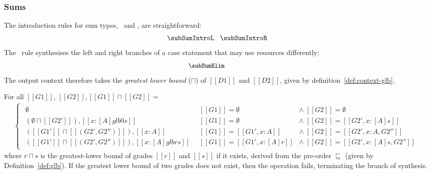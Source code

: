 \subsubsection{Sums}
The introduction rules for sum types, \subSumIntroLname\ and \subSumIntroRname, are straightforward:
\begin{align*}
  \subSumIntroL
\;\;\;
  \subSumIntroR
\end{align*}
The \subSumElimName\ rule synthesises the left and
right branches of a case statement that may use resources
differently:
\begin{align*}
\begin{array}{c}
\hspace{-3em}{\small{\subSumElim}}
\end{array}
\end{align*}
The output context therefore takes the \textit{greatest
lower bound} ($\sqcap$) of $[[ D1 ]]$ and $[[ D2 ]]$, given by definition~\ref{def:context-glb},
\begin{definition}\label{def:context-glb}
For all $[[ G1 ]]$, $[[ G2 ]], [[G1]] \sqcap [[G2]] =$
\begin{align*}
\left\{\begin{matrix}
\begin{array}{lll}
\emptyset
  & [[ G1 ]] = \emptyset & \wedge \; [[ G2 ]] = \emptyset
\\
%
(\emptyset \sqcap [[ G2' ]]), [[ x : [ A ] {glb 0 s} ]]
  & [[ G1 ]] = \emptyset & \wedge \; [[G2]] = [[ G2',x : [A] s]]
\\
%
([[G1']] \sqcap [[(G2',G2'')]]), [[x : A]]
 & [[G1]] = [[{G1', x : A} ]] & \wedge \; [[ G2 ]] = [[ {G2', x : A}, G2'' ]]
\\
%
([[G1']] \sqcap [[(G2',G2'')]]), [[x : [A] {glb r s}]]\;\;
 & [[G1]] = [[ G1',x : [A] r]] & \wedge \; [[ G2 ]] = [[{G2', x : [A] s}, G2'']]
\end{array}
\end{matrix}\right.
\end{align*}
where $r\!\sqcap\!s$ is the greatest-lower bound of grades $[[r]]$ and $[[s]]$
if it exists, derived from the pre-order $\sqsubseteq$ (given by
Definition~\ref{def:glb}). If the greatest lower bound of two grades does not
exist, then the operation fails, terminating the branch of synthesis. 
\end{definition}
%
%

